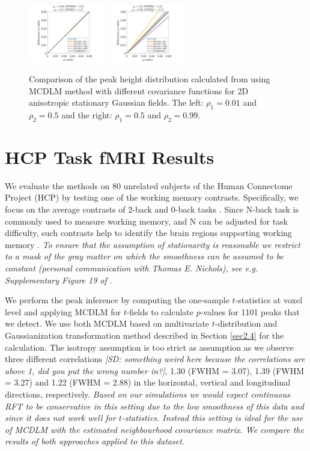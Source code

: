 \documentclass{article}
\newcommand{\sdcom}[1]{\textit{\color{red} [SD: #1]}}
\newcommand{\nt}[1]{\textit{\color{red} #1}}
\begin{document}
\begin{figure}[!htp]
\centering
\includegraphics[trim=100 5 100 5, clip,width=0.3\textwidth]{figure/2D_rho1_0.01_rho2_0.5.jpg}
\includegraphics[trim=100 5 100 5, clip,width=0.3\textwidth]{figure/2D_rho1_0.5_rho2_0.99.jpg}
\caption{Comparison of the peak height distribution calculated from using MCDLM method with different covariance functions for 2D anisotropic stationary Gaussian fields. The left: $\rho_1 = 0.01$ and $\rho_2 = 0.5$ and the right: $\rho_1 = 0.5$ and $\rho_2 = 0.99$. \label{fig15}}
\end{figure}

\section{HCP Task fMRI Results}
\label{sec5}
We evaluate the methods on 80 unrelated subjects of the Human Connectome Project (HCP) by testing one of the working memory contrasts. Specifically, we focus on the average contrasts of 2-back and 0-back tasks \citep{davenport2020selective}. Since N-back task is commonly used to measure working memory, and N can be adjusted for task difficulty, such contrasts help to identify the brain regions supporting working memory \citep{kirchner1958age}.  \nt{To ensure that the assumption of stationarity is reasonable we restrict to a mask of the gray matter on which the smoothness can be assumed to be constant (personal communication with Thomas E. Nichols), see e.g. Supplementary Figure 19 of \cite{eklund2016cluster}}. 

We perform the peak inference by computing the one-sample $t$-statistics at voxel level and applying MCDLM for $t$-fields to calculate $p$-values for 1101 peaks that we detect. We use both MCDLM based on multivariate $t$-distribution and Gaussianization transformation method described in Section \ref{sec2.4} for the calculation. The isotropy assumption is too strict as assumption as we observe three different correlations \sdcom{something weird here because the correlations are above 1, did you put the wrong number in?}, 1.30 (FWHM = 3.07), 1.39 (FWHM = 3.27) and 1.22 (FWHM = 2.88) in the horizontal, vertical and longitudinal directions, respectively. \nt{Based on our simulations we would expect continuous RFT to be conservative in this setting due to the low smoothness of this data and since it does not work well for $t$-statistics. Instead this setting is ideal for the use of MCDLM with the estimated neighbourhood covariance matrix. We compare the results of both approaches applied to this dataset.}
\end{document}
